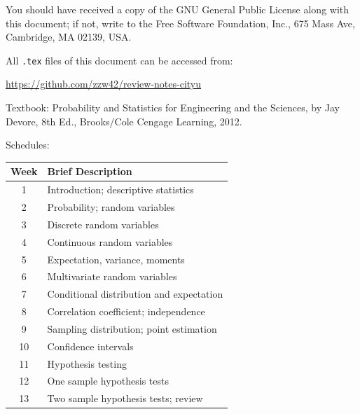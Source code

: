 \documentclass[UTF8,a4paper,10pt,openany]{book}
\theoremstyle{plain}
\theoremstyle{definition}
\begin{document}
You should have received a copy of the GNU General Public License along with this document; if not, write to the Free Software Foundation, Inc., 675 Mass Ave, Cambridge, MA 02139, USA.

All \texttt{.tex} files of this document can be accessed from:

\url{https://github.com/zzw42/review-notes-cityu}

Textbook: Probability and Statistics for Engineering and the Sciences, by Jay Devore, 8th Ed., Brooks/Cole Cengage Learning, 2012. 

Schedules:

\begin{center}
\begin{tabular}{cl}
\hline\hline
Week & Brief Description \\
\hline
1 & Introduction; descriptive statistics \\
2 & Probability; random variables \\
3 & Discrete random variables \\
4 & Continuous random variables \\
5 & Expectation, variance, moments \\
6 & Multivariate random variables \\
7 & Conditional distribution and expectation \\
8 & Correlation coefficient; independence \\
9 & Sampling distribution; point estimation \\
10 & Confidence intervals  \\
11 & Hypothesis testing \\
12 & One sample hypothesis tests \\
13 & Two sample hypothesis tests; review \\
\hline\hline
\end{tabular}
\end{center}

\frontmatter
\tableofcontents
\listoffigures

\mainmatter
\clearpage
\setcounter{page}{1}






\end{document}
